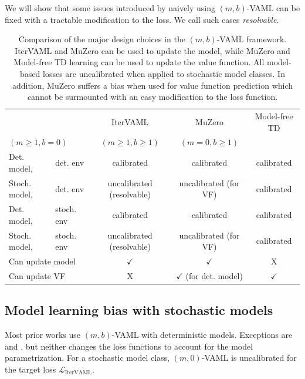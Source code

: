We will show that some issues introduced by naively using $(m,b)$-VAML can be fixed with a tractable modification to the loss.
We call such cases \emph{resolvable}.


\begin{table}
{\footnotesize
\centering
    \begin{tabular}{l l|c|c|c}
        && IterVAML &  MuZero &  Model-free TD \\
        \multicolumn{2}{l|}{$(m\geq1,b=0)$} &  $(m\geq1,b\geq1)$& $(m=0,b\geq1)$\\\hline
        Det. model,& det. env & {\color{newbluedeal} calibrated} & {\color{newbluedeal} calibrated} & {\color{newbluedeal} calibrated} \\
        Stoch. model,& det. env & {\color{newgreendeal} uncalibrated (resolvable)} & {\color{uoftred} uncalibrated (for VF)} & {\color{newbluedeal} calibrated}\\
        Det. model,& stoch. env & {\color{newbluedeal} calibrated} & {\color{newbluedeal} calibrated}  & {\color{newbluedeal} calibrated} \\
        Stoch. model,& stoch. env & {\color{newgreendeal} uncalibrated (resolvable)} & {\color{uoftred} uncalibrated (for VF)} & {\color{newbluedeal} calibrated} \\\hline
        \multicolumn{2}{l|}{Can update model} & {\color{newbluedeal} $\checkmark$} & {\color{newbluedeal} $\checkmark$}& \color{uoftred} X \\
        \multicolumn{2}{l|}{Can update VF}   & \color{uoftred} X & {\color{newgreendeal} $\checkmark$ (for det. model)}  & {\color{newbluedeal} $\checkmark$}
    \end{tabular}}
    \caption{Comparison of the major design choices in the $(m,b)$-VAML framework. IterVAML and MuZero can be used to update the model, while MuZero and Model-free TD learning can be used to update the value function. All model-based losses are uncalibrated when applied to stochastic model classes. In addition, MuZero suffers a bias when used for value function prediction which cannot be surmounted with an easy modification to the loss function.}
    \label{tab:cvaml:bias_overview}
\end{table}

\subsection{Model learning bias with stochastic models}

Most prior works use $(m,b)$-VAML with deterministic models.
Exceptions are \textcite{voelcker2022value} and \textcite{antonoglou2022planning}, but neither changes the loss functions to account for the model parametrization.
For a stochastic model class, $(m,0)$-VAML is uncalibrated for the target loss $\mathcal{L}_\mathrm{IterVAML}$.

